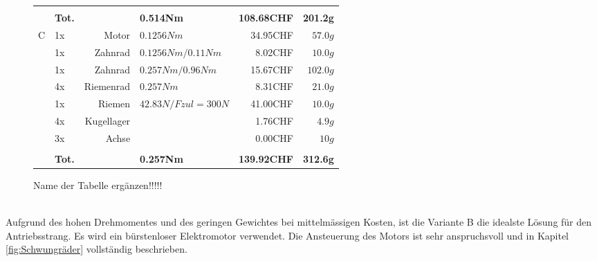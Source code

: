 \begin{figure}[h!]
\begin{tabular}{p{0.5cm}p{0.8cm}rp{3cm}rr}
		&       &                 &                      &          &  \\
		& \textbf{Tot.} &       & \textbf{0.514Nm} & \textbf{108.68CHF} & \textbf{201.2g} \\
		\multirow{9}[2]{*}{C} 
		& 1x    & Motor           & $0.1256 Nm$          & 34.95CHF & $57.0 g$ \\
		& 1x    & Zahnrad         & $0.1256 Nm / 0.11 Nm$& 8.02CHF  & $10.0 g$ \\
		& 1x    & Zahnrad         & $0.257 Nm / 0.96 Nm$ & 15.67CHF & $102.0 g$ \\
		& 4x    & Riemenrad       & $0.257 Nm$           & 8.31CHF  & $21.0 g$ \\
		& 1x    & Riemen          & $42.83 N / Fzul=300 N$ & 41.00CHF & $10.0 g$ \\
		& 4x    & Kugellager      &                      & 1.76CHF  & $4.9 g$ \\
		& 3x    & Achse           &                      & 0.00CHF  & $10 g$ \\
		&       &                 &                      &          &  \\
		& \textbf{Tot.} &       & \textbf{0.257Nm} & \textbf{139.92CHF} & \textbf{312.6g} \\
	\end{tabular}%
	\centering
	\caption{Name der Tabelle ergänzen!!!!!}
	\label{tab:addlabel}%
\end{figure}\\
Aufgrund des hohen Drehmomentes und des geringen Gewichtes bei mittelmässigen Kosten, ist die Variante B die idealste Lösung für den Antriebsstrang. Es wird ein bürstenloser Elektromotor verwendet. Die Ansteuerung des Motors ist sehr anspruchsvoll und in Kapitel \ref{fig:Schwungräder} vollständig beschrieben.
